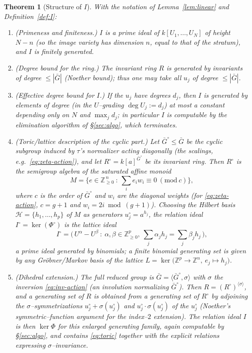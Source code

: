 \documentclass{amsart}
\newtheorem{theorem}{Theorem}
\theoremstyle{definition}
\begin{document}
\begin{theorem}[Structure of $I$]\label{thm:main}
With the notation of Lemma~\ref{lem:linear} and Definition~\ref{def:I}:
\begin{enumerate}
\item[(a)] \emph{(Primeness and finiteness.)} $I$ is a prime ideal of
$k[U_1,\dots,U_N]$ of height $N-n$ (so the image variety has dimension $n$, equal
to that of the stratum), and $I$ is finitely generated.
\item[(b)] \emph{(Degree bound for the ring.)} The invariant ring $R$ is generated
by invariants of degree $\le |\bar G|$ (Noether bound); thus one may take all
$u_j$ of degree $\le|\bar G|$.
\item[(c)] \emph{(Effective degree bound for $I$.)} If the $u_j$ have degrees
$d_j$, then $I$ is generated by elements of degree (in the $U$--grading
$\deg U_j:=d_j$) at most a constant depending only on $N$ and $\max_j d_j$; in
particular $I$ is computable by the elimination algorithm of \S\ref{sec:algo},
which terminates.
\item[(d)] \emph{(Toric/lattice description of the cyclic part.)} Let
$\bar G^{\circ}\le\bar G$ be the cyclic subgroup induced by $\tau$'s normalizer
acting diagonally (the scalings, e.g.\ \eqref{eq:zeta-action}), and let
$R^{\circ}=k[a]^{\bar G^{\circ}}$ be its invariant ring. Then $R^{\circ}$ is the
semigroup algebra of the saturated affine monoid
\[
 M=\{e\in\mathbb{Z}_{\ge0}^{\,n}\ :\ \textstyle\sum_i e_i w_i\equiv 0\ (\mathrm{mod}\ c)\},
\]
where $c$ is the order of $\bar G^{\circ}$ and $w_i$ are the diagonal weights
(for \eqref{eq:zeta-action}, $c=g+1$ and $w_i=2i\bmod(g+1)$). Choosing the
Hilbert basis $\mathcal H=\{h_1,\dots,h_p\}$ of $M$ as generators
$u^{\circ}_j=a^{h_j}$, the relation ideal $I^{\circ}=\ker(\Phi^{\circ})$ is the
\emph{lattice ideal}
\begin{equation}\label{eq:toric}
 I^{\circ}=\bigl(\,U^{\alpha}-U^{\beta}\ :\ \alpha,\beta\in\mathbb{Z}_{\ge0}^{p},\
 \textstyle\sum_j \alpha_j h_j=\sum_j\beta_j h_j\,\bigr),
\end{equation}
a prime ideal generated by \emph{binomials}; a finite binomial generating set is
given by any Gr\"obner/Markov basis of the lattice
$L=\ker\bigl(\mathbb{Z}^{p}\to\mathbb{Z}^{n},\ e_j\mapsto h_j\bigr)$.
\item[(e)] \emph{(Dihedral extension.)} The full reduced group is
$\bar G=\langle \bar G^{\circ},\sigma\rangle$ with $\sigma$ the inversion
\eqref{eq:inv-action} (an involution normalizing $\bar G^{\circ}$). Then
$R=(R^{\circ})^{\langle\sigma\rangle}$, and a generating set of $R$ is obtained
from a generating set of $R^{\circ}$ by adjoining the $\sigma$--symmetrizations
$u^{\circ}_j+\sigma(u^{\circ}_j)$ and $u^{\circ}_j\cdot\sigma(u^{\circ}_j)$
of the $u^{\circ}_j$ (Noether's symmetric--function argument for the index--$2$
extension). The relation ideal $I$ is then $\ker\Phi$ for this enlarged generating
family, again computable by \S\ref{sec:algo}, and contains
\eqref{eq:toric} together with the explicit relations expressing
$\sigma$--invariance.
\end{enumerate}
\end{theorem}
\end{document}
